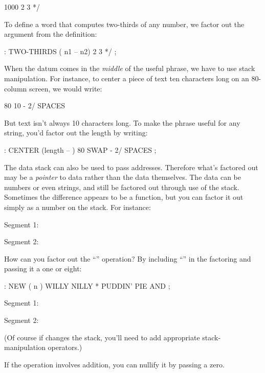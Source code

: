 \begin{Code}
1000 2 3 */
\end{Code}
To define a word that computes two-thirds of any number, we factor out
the argument from the definition:

\begin{Code}
: TWO-THIRDS  ( n1 -- n2)  2 3 */ ;
\end{Code}
When the datum comes in the \emph{middle} of the useful phrase, we
have to use stack manipulation. For instance, to center a piece of
text ten characters long on an 80-column screen, we would write:

\begin{Code}
80  10 -  2/ SPACES
\end{Code}
But text isn't always 10 characters long. To make the phrase useful
for any string, you'd factor out the length by writing:

\begin{Code}
: CENTER (length -- ) 80 SWAP - 2/ SPACES ;
\end{Code}
The data stack can also be used to pass addresses. Therefore what's
factored out may be a \emph{pointer} to data rather than the data
themselves. The data can be numbers or even strings, and still be
factored out through use of the stack.  Sometimes the difference
appears to be a function, but you can factor it out simply as a number
on the stack. For instance:

\bigskip

Segment 1:	

Segment 2:	

\bigskip

\noindent
How can you factor out the ``'' operation? By including
``\forth{*}'' in the factoring and passing it a one or eight:

\begin{Code}
: NEW  ( n )  WILLY NILLY * PUDDIN' PIE AND ;
\end{Code}

Segment 1:    

Segment 2:    

\bigskip

\noindent 
(Of course if  changes the stack, you'll need to
add appropriate stack-manipulation operators.)

If the operation involves addition, you can nullify it by passing a
zero.

